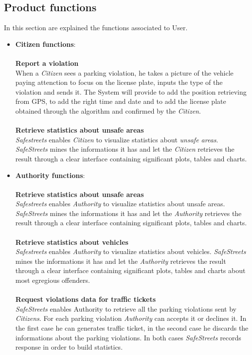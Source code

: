 \documentclass{article}
\begin{document}
\subsection{Product functions}
In this section are explained the functions associated to User.
\begin{itemize}
    \item \textbf{Citizen functions}:
    \\
    \\
    \textbf{Report a violation}
    \\When a \textit{Citizen} sees a parking violation, he takes a picture of the vehicle paying attenction to focus on the 
    license plate, inputs the type of the violation and sends it. The System will provide to add the position retrieving 
    from GPS, to add the right time and date and to add the license plate obtained through the algorithm and confirmed by
    the \textit{Citizen}. 
    \\
    \\
    \textbf{Retrieve statistics about unsafe areas}
    \\\textit{Safestreets} enables \textit{Citizen} to visualize statistics about \textit{unsafe areas}. \textit{SafeStreets} 
    mines the informations it has and let the \textit{Citizen} retrieves the result through a clear interface containing 
    significant plots, tables and charts. 

    \item \textbf{Authority functions}:
    \\
    \\
    \textbf{Retrieve statistics about unsafe areas}
    \\\textit{Safestreets} enables \textit{Authority} to visualize statistics about unsafe areas. \textit{SafeStreets} mines the 
    informations it has and let the \textit{Authority} retrieves the result through a clear interface containing significant plots, 
    tables and charts.
    \\
    \\
    \textbf{Retrieve statistics about vehicles}
    \\\textit{Safestreets} enables \textit{Authority} to visualize statistics about vehicles. \textit{SafeStreets} mines the 
    informations it has and let the \textit{Authority} retrieves the result through a clear interface containing 
    significant plots, tables and charts about most egregious offenders.
    \\
    \\
    \textbf{Request violations data for traffic tickets}
    \\\textit{SafeStreets} enables Authority to retrieve all the parking violations sent by \textit{Citizens}. For each 
    parking violation \textit{Authority} can accepts it or declines it. In the first case he can generates traffic ticket, 
    in the second case he discards the informations about the parking violations. In both cases \textit{SafeStreets} records 
    response in order to build statistics.

\end{itemize}
\end{document}
